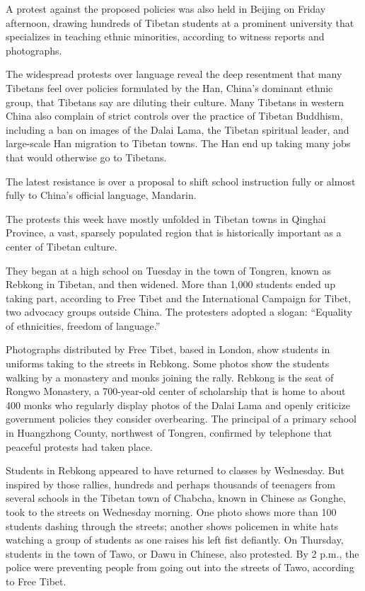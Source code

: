 ﻿\documentclass[12pt]{article}
\begin{document}
A protest against the proposed policies was also held in Beijing on Friday afternoon, drawing
hundreds of Tibetan students at a prominent university that specializes in teaching ethnic
minorities, according to witness reports and photographs.

The widespread protests over language reveal the deep resentment that many Tibetans feel over
policies formulated by the Han, China's dominant ethnic group, that Tibetans say are diluting their
culture. Many Tibetans in western China also complain of strict controls over the practice of
Tibetan Buddhism, including a ban on images of the Dalai Lama, the Tibetan spiritual leader, and
large-scale Han migration to Tibetan towns. The Han end up taking many jobs that would otherwise go
to Tibetans.

The latest resistance is over a proposal to shift school instruction fully or almost fully to
China's official language, Mandarin.

The protests this week have mostly unfolded in Tibetan towns in Qinghai Province, a vast, sparsely
populated region that is historically important as a center of Tibetan culture.

They began at a high school on Tuesday in the town of Tongren, known as Rebkong in Tibetan, and then
widened. More than 1,000 students ended up taking part, according to Free Tibet and the
International Campaign for Tibet, two advocacy groups outside China. The protesters adopted a
slogan: ``Equality of ethnicities, freedom of language.''

Photographs distributed by Free Tibet, based in London, show students in uniforms taking to the
streets in Rebkong. Some photos show the students walking by a monastery and monks joining the
rally. Rebkong is the seat of Rongwo Monastery, a 700-year-old center of scholarship that is home to
about 400 monks who regularly display photos of the Dalai Lama and openly criticize government
policies they consider overbearing. The principal of a primary school in Huangzhong County,
northwest of Tongren, confirmed by telephone that peaceful protests had taken place.

Students in Rebkong appeared to have returned to classes by Wednesday. But inspired by those
rallies, hundreds and perhaps thousands of teenagers from several schools in the Tibetan town of
Chabcha, known in Chinese as Gonghe, took to the streets on Wednesday morning. One photo shows more
than 100 students dashing through the streets; another shows policemen in white hats watching a
group of students as one raises his left fist defiantly. On Thursday, students in the town of Tawo,
or Dawu in Chinese, also protested. By 2 p.m., the police were preventing people from going out into
the streets of Tawo, according to Free Tibet.
\end{document}
